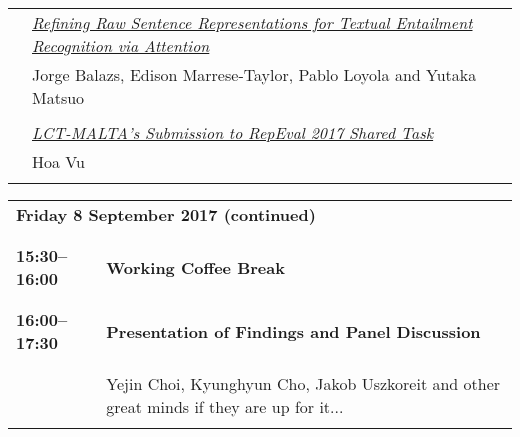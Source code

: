 \begin{tabular}{p{20mm}p{128mm}}
 & \hyperlink{page.41}{\em Refining Raw Sentence Representations for Textual Entailment Recognition via Attention}\\
         & Jorge Balazs, Edison Marrese-Taylor, Pablo Loyola and Yutaka Matsuo \\
\\

 & \hyperlink{page.46}{\em LCT-MALTA's Submission to RepEval 2017 Shared Task}\\
         & Hoa Vu \\
\\

\end{tabular}
\newpage
\begin{tabular}{p{20mm}p{128mm}}
\\
\multicolumn{2}{l}{\bf Friday 8 September 2017 (continued)} \\\\
\\{\bf 15:30--16:00} & {\bf Working Coffee Break} \\
\\
\\{\bf 16:00--17:30} & {\bf Presentation of Findings and Panel Discussion} \\
\\
 & {\em  }\\
         & Yejin Choi, Kyunghyun Cho, Jakob Uszkoreit and other great minds if they are up for it...\\
\\


\end{tabular}
